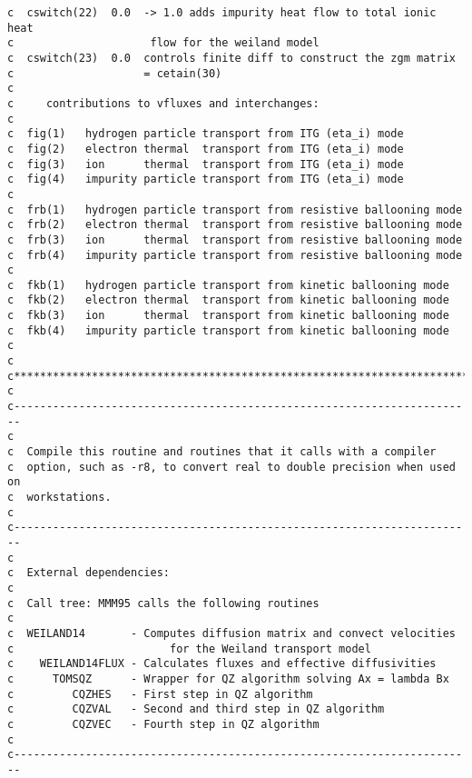 \begin{verbatim}
c  cswitch(22)  0.0  -> 1.0 adds impurity heat flow to total ionic heat 
c                     flow for the weiland model
c  cswitch(23)  0.0  controls finite diff to construct the zgm matrix 
c                    = cetain(30)
c
c     contributions to vfluxes and interchanges: 
c
c  fig(1)   hydrogen particle transport from ITG (eta_i) mode
c  fig(2)   electron thermal  transport from ITG (eta_i) mode
c  fig(3)   ion      thermal  transport from ITG (eta_i) mode
c  fig(4)   impurity particle transport from ITG (eta_i) mode
c
c  frb(1)   hydrogen particle transport from resistive ballooning mode
c  frb(2)   electron thermal  transport from resistive ballooning mode
c  frb(3)   ion      thermal  transport from resistive ballooning mode
c  frb(4)   impurity particle transport from resistive ballooning mode
c
c  fkb(1)   hydrogen particle transport from kinetic ballooning mode
c  fkb(2)   electron thermal  transport from kinetic ballooning mode
c  fkb(3)   ion      thermal  transport from kinetic ballooning mode
c  fkb(4)   impurity particle transport from kinetic ballooning mode
c
c
c***********************************************************************
c
c-----------------------------------------------------------------------
c
c  Compile this routine and routines that it calls with a compiler 
c  option, such as -r8, to convert real to double precision when used on 
c  workstations.
c
c-----------------------------------------------------------------------
c
c  External dependencies:
c
c  Call tree: MMM95 calls the following routines
c
c  WEILAND14       - Computes diffusion matrix and convect velocities
c                        for the Weiland transport model
c    WEILAND14FLUX - Calculates fluxes and effective diffusivities
c      TOMSQZ      - Wrapper for QZ algorithm solving Ax = lambda Bx
c         CQZHES   - First step in QZ algorithm 
c         CQZVAL   - Second and third step in QZ algorithm
c         CQZVEC   - Fourth step in QZ algorithm
c
c-----------------------------------------------------------------------


\end{verbatim}
